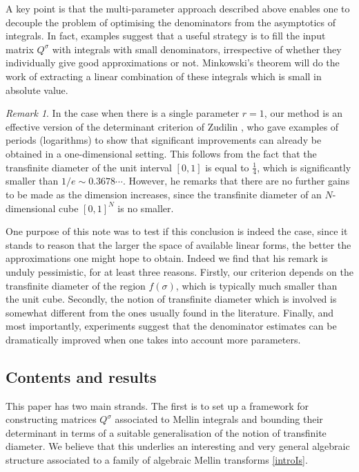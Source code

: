 \documentclass[a4paper,10pt]{amsart}
\theoremstyle{definition}
\theoremstyle{remark}
\newtheorem{rem}[thm]{Remark}
\numberwithin{equation}{section}
\newcommand{\0}{\color{blue}{\mathsf{0}}}
\begin{document}
A key point is that the multi-parameter approach described above enables one to decouple the problem of optimising the denominators from the asymptotics of integrals.  In fact, examples suggest that a useful strategy is to fill the input matrix $Q^{\sigma}$ with  integrals with small denominators, irrespective of whether they individually give good approximations  or not. Minkowski's theorem will do the work of extracting a linear combination of these integrals which is small in absolute value. 

\begin{rem}
In the case when there is a single parameter $r=1$, our method is an effective version of the determinant criterion of Zudilin \cite{ZudilinDet}, who gave examples of periods (logarithms) to  show that significant improvements can already be obtained  in a one-dimensional setting. This follows from  the fact that the transfinite diameter of the unit interval $[0,1]$ is equal to $\frac{1}{4}$, which is  significantly smaller than $1/e\sim 0.3678\cdots$.  However, he remarks that there are no further gains to be made as the dimension increases, since the transfinite diameter of an $N$-dimensional cube $[0,1]^N$ is no smaller.  

One purpose of this note was to test if this conclusion  is indeed the case, since it stands to reason that the larger the space of available linear forms, the better the approximations one might hope to obtain. Indeed
  we find that his remark is unduly pessimistic, for  at least three reasons. Firstly,  our  criterion depends on  the transfinite diameter of the region $f(\sigma)$, which is typically much smaller than the unit cube. Secondly,  the notion of transfinite diameter which is involved is somewhat different  from the ones usually found in the literature. Finally, and most importantly, experiments suggest  that  the denominator estimates can  be dramatically improved  when one takes into account more parameters.
\end{rem} 

\subsection{Contents and results}
This paper has two main strands. The first is to set up a framework for constructing matrices $Q^{\sigma}$ associated to Mellin integrals and bounding their determinant in terms of a suitable generalisation of the notion of transfinite diameter.  We believe that this underlies  an interesting and very  general algebraic structure associated to a family of  algebraic  Mellin transforms \eqref{introIs}.
\end{document}
